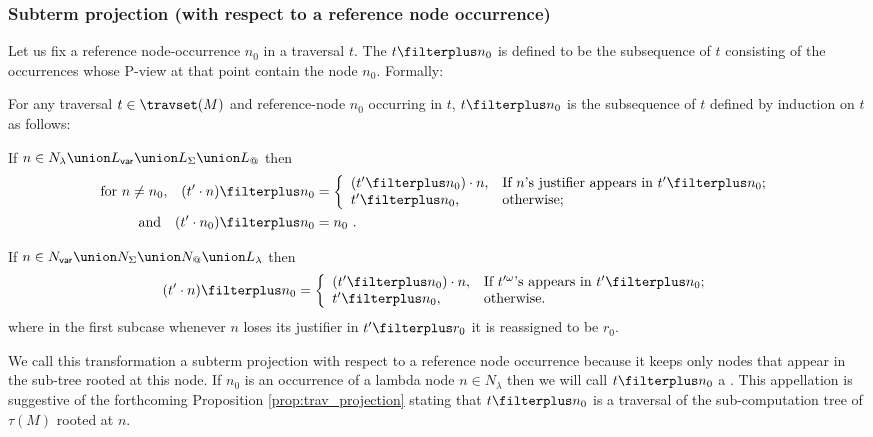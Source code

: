 \subsubsection{Subterm projection (with respect to a reference node occurrence)}
\label{sec:tstar}
Let us fix a reference node-occurrence $n_0$ in a traversal $t$.
The  $t \filterplus n_0$ is defined to be the subsequence of $t$ consisting of the occurrences
whose P-view at that point contain the node $n_0$. Formally:
\begin{definition}
For any traversal $t\in \travset(M)$ and reference-node $n_0$ occurring in $t$, $t \filterplus n_0$
is the subsequence of $t$ defined by induction on $t$ as follows:
\begin{compactitem}
\item If $n\in N_\lambda \union L_{\sf var} \union L_\Sigma \union L_@$ then
\begin{align*}
\hbox{for $n\neq n_0$,}\quad (t' \cdot n) \filterplus n_0 &= \left\{
                                  \begin{array}{ll}
                                    (t'\filterplus n_0) \cdot n, & \hbox{If $n$'s justifier appears in $t'\filterplus n_0$;} \\
                                    t'\filterplus n_0, & \hbox{otherwise;}
                                  \end{array}
                                \right. \\
\hbox{and}\quad         (t' \cdot n_0) \filterplus n_0& = n_0 \ .
\end{align*}

\item If $n \in N_{\sf var} \union N_\Sigma \union N_@ \union L_\lambda$ then
$$
(t' \cdot n) \filterplus n_0 = \left\{
                                  \begin{array}{ll}
                                    (t'\filterplus n_0) \cdot n, & \hbox{If $t'^\omega$'s appears in $t'\filterplus n_0$;} \\
                                    t'\filterplus n_0, & \hbox{otherwise.}
                                  \end{array}
                                \right.
$$
where in the first subcase whenever $n$ loses its justifier in
$t'\filterplus r_0$ it is reassigned to be $r_0$.
\end{compactitem}
\end{definition}

We call this transformation a subterm projection with respect to a reference node occurrence because it keeps only nodes
that appear in the sub-tree rooted at this node. If $n_0$ is an occurrence of a lambda node $n \in N_\lambda$ then we
will call $t \filterplus n_0$ a . This appellation is suggestive of the
forthcoming Proposition \ref{prop:trav_projection} stating that $t
\filterplus n_0$ is a traversal of the sub-computation tree of
$\tau(M)$ rooted at $n$.
\bigskip


